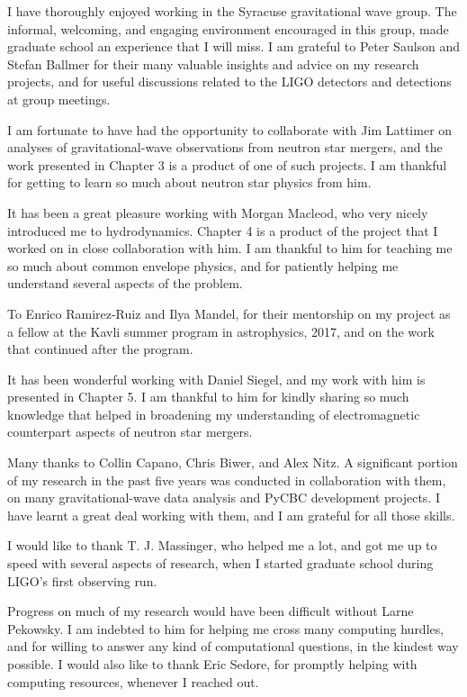 I have thoroughly enjoyed working in the Syracuse gravitational wave group. The informal, welcoming, and engaging environment encouraged in this group, made graduate school an experience that I will miss. I am grateful to Peter Saulson and Stefan Ballmer for their many valuable insights and advice on my research projects, and for useful discussions related to the LIGO detectors and detections at group meetings.

I am fortunate to have had the opportunity to collaborate with Jim Lattimer on analyses of gravitational-wave observations from neutron star mergers, and the work presented in Chapter 3 is a product of one of such projects. I am thankful for getting to learn so much about neutron star physics from him.

It has been a great pleasure working with Morgan Macleod, who very nicely introduced me to hydrodynamics. Chapter 4 is a product of the project that I worked on in close collaboration with him. I am thankful to him for teaching me so much about common envelope physics, and for patiently helping me understand several aspects of the problem.

To Enrico Ramirez-Ruiz and Ilya Mandel, for their mentorship on my project as a fellow at the Kavli summer program in astrophysics, 2017, and on the work that continued after the program.

It has been wonderful working with Daniel Siegel, and my work with him is presented in Chapter 5. I am thankful to him for kindly sharing so much knowledge that helped in broadening my understanding of electromagnetic counterpart aspects of neutron star mergers.

Many thanks to Collin Capano, Chris Biwer, and Alex Nitz. A significant portion of my research in the past five years was conducted in collaboration with them, on many gravitational-wave data analysis and PyCBC development projects. I have learnt a great deal working with them, and I am grateful for all those skills.

I would like to thank T. J. Massinger, who helped me a lot, and got me up to speed with several aspects of research, when I started graduate school during LIGO's first observing run.

Progress on much of my research would have been difficult without Larne Pekowsky. I am indebted to him for helping me cross many computing hurdles, and for willing to answer any kind of computational questions, in the kindest way possible. I would also like to thank Eric Sedore, for promptly helping with computing resources, whenever I reached out.

